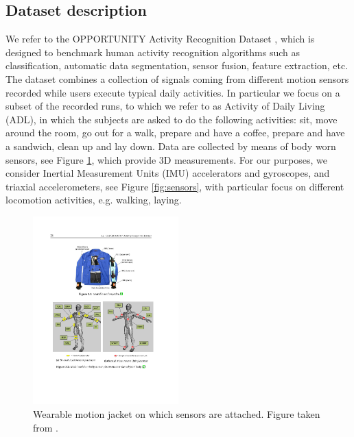 \documentclass[10pt, a4paper, twocolumn]{article}
\theoremstyle{definition}
\begin{document}
\subsection{Dataset description}
We refer to the OPPORTUNITY Activity Recognition Dataset \cite{opportunity}, which is designed to benchmark human activity recognition algorithms such as classification, automatic data segmentation, sensor fusion, feature extraction, etc.
The dataset  combines a collection of signals coming from different motion sensors recorded while users execute typical daily activities. In particular we focus on a subset of the recorded runs, to which we refer to as Activity of Daily Living (ADL), in which the subjects are asked to do the following activities: sit, move around the room, go out for a walk, prepare and have a coffee, prepare and have a sandwich, clean up and lay down.
Data are collected by means of body worn sensors, see Figure \ref{fig:jacket}, which provide 3D measurements. For our purposes, we consider Inertial Measurement Units (IMU) accelerators and gyroscopes, and triaxial accelerometers, see Figure \ref{fig:sensors}, with particular focus on different locomotion activities, e.g. walking, laying.
\begin{figure} 
         \includegraphics[width=0.5\textwidth]{images/jacket_wearable.pdf}
    \caption{Wearable motion jacket on which sensors are attached. Figure taken from \cite{opportunity}.}\label{fig:jacket}
\end{figure}
\end{document}
